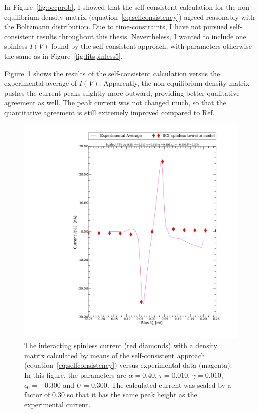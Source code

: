 In Figure~\ref{fig:occprob}, I showed that the self-consistent calculation for the non-equilibrium density matrix (equation~\ref{eq:selfconsistency}) agreed reasonably with the Boltzmann distribution. Due to time-constraints, I have not pursued self-consistent results throughout this thesis. Nevertheless, I wanted to include one spinless $I(V)$ found by the self-consistent approach, with parameters otherwise the same as in Figure~\ref{fig:fitspinless5}.

Figure~\ref{fig:figselfconsistent} shows the results of the self-consistent calculation versus the experimental average of $I(V)$. Apparently, the non-equilibrium density matrix pushes the current peaks slightly more outward, providing better qualitative agreement as well. The peak current was not changed much, so that the quantitative agreement is still extremely improved compared to Ref.~\cite{perrinnano}.


\begin{figure}[htb]
    \centering
    \includegraphics[width=.95\textwidth, clip=true, trim=11cm 2cm 2cm 0cm]{pdf/selfconsistent_fit_current_0.pdf}
    \caption{The interacting spinless current (red diamonds) with a density matrix calculated by means of the self-consistent approach (equation~\ref{eq:selfconsistency}) versus experimental data (magenta). In this figure, the parameters are $\alpha=0.40$, $\tau=0.010$, $\gamma=0.010$, $\epsilon_0=-0.300$ and $U=0.300$. The calculated current was scaled by a factor of $0.30$ so that it has the same peak height as the experimental current.  }  
    \label{fig:figselfconsistent}
\end{figure} 
\clearpage
{}